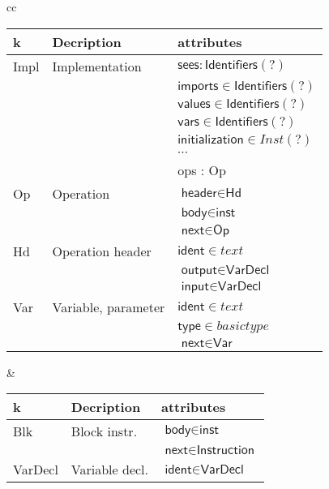 \documentclass{article}
\begin{document}
\begin{table}
  \begin{center}
    \begin{tabular}[t]{cc}
      \begin{tabular}[t]{|l|l|l|}
        \hline
        \textsf{k} & Decription & attributes\\
        \hline
        \hline
        \textsf{Impl} & Implementation & $\textsf{sees} : \textsf{Identifiers} (?)$\\
        & & $\textsf{imports} \in \textsf{Identifiers} (?)$ \\
        & & $\textsf{values} \in \textsf{Identifiers} (?)$ \\
        & & $\textsf{vars} \in \textsf{Identifiers} (?)$ \\
        & & $\textsf{initialization} \in Inst (?)$ \\
        & & $\cdots$ \\
        & & \textsf{ops} : Op \\
        \hline
        \textsf{Op} & Operation & $\textsf{header} \in \textsf{Hd} $\\
        & & $\textsf{body} \in \textsf{inst}$ \\
        & & $\textsf{next} \in \textsf{Op} $\\
        \hline
        \textsf{Hd} & Operation header & $ \textsf{ident} \in text$ \\
        & & $\textsf{output} \in \textsf{VarDecl}$ \\
        & & $\textsf{input} \in \textsf{VarDecl}$ \\
        \hline
        \textsf{Var} & Variable, parameter & $ \textsf{ident} \in text $\\
        & & $\textsf{type} \in basic type $\\
        & & $\textsf{next} \in \textsf{Var} $\\
        \hline
      \end{tabular}
      &
      \begin{tabular}[t]{|l|l|l|}
        \hline
        \textsf{k} & Decription & attributes\\
        \hline
        \hline
        \textsf{Blk} & Block instr. & $\textsf{body} \in \textsf{inst}$ \\
        & & $\textsf{next} \in \textsf{Instruction}$ \\
        \hline
        \textsf{VarDecl} & Variable decl. & $\textsf{ident}\in \textsf{VarDecl} $\\

\end{tabular}
\end{tabular}
\end{center}
\end{table}
\end{document}
